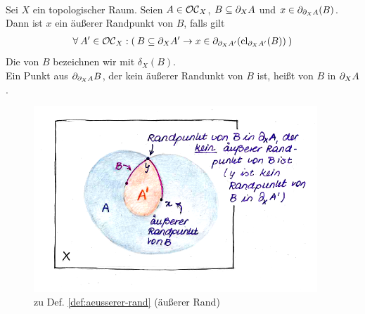 % 
%
    \begin{dfn}\label{def:aeusserer-rand} \ \vspace{8pt}

        \noindent
        Sei $X$ ein topologischer Raum.
        Seien $A \in \mathcal{OC}_X$, $B \subseteq \partial_X A$ und $x \in \partial_{\partial_X A}(B)$. Dann ist $x$ ein äußerer Randpunkt von $B$, falls gilt
        \begin{align*}
            \forall\: A' \in \mathcal{OC}_X : (\: B \subseteq \partial_X A' \rightarrow x \in \partial_{\partial_X A'}(\text{cl}_{\partial_X A'}(B)) \:)
        \end{align*}
        Die  von $B$ bezeichnen wir mit $\delta_X(B)$.\\
        Ein Punkt aus $\partial_{\partial_X A} B$, der kein äußerer Randunkt von $B$ ist, heißt  von $B$ in $\partial_X A$.
    \end{dfn}
%
%
    \begin{figure}[ht]
        \centering
        \includegraphics[height=7cm]{abb/aeusserer-rand.png}
        \caption{zu Def. \ref{def:aeusserer-rand} (äußerer Rand)}
        \label{fig:aeus-rand}
    \end{figure}
